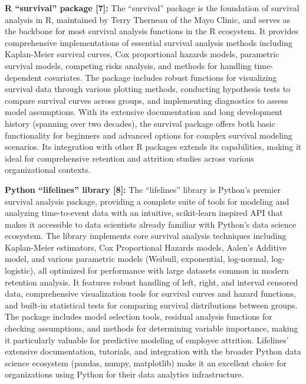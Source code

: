 \documentclass[./main.tex]{subfiles}
\begin{document}
\textbf{R ``survival'' package {[}7{]}:} The ``survival'' package is the
foundation of survival analysis in R, maintained by Terry Therneau of
the Mayo Clinic, and serves as the backbone for most survival analysis
functions in the R ecosystem. It provides comprehensive implementations
of essential survival analysis methods including Kaplan-Meier survival
curves, Cox proportional hazards models, parametric survival models,
competing risks analysis, and methods for handling time-dependent
covariates. The package includes robust functions for visualizing
survival data through various plotting methods, conducting hypothesis
tests to compare survival curves across groups, and implementing
diagnostics to assess model assumptions. With its extensive
documentation and long development history (spanning over two decades),
the survival package offers both basic functionality for beginners and
advanced options for complex survival modeling scenarios. Its
integration with other R packages extends its capabilities, making it
ideal for comprehensive retention and attrition studies across various
organizational contexts.

\textbf{Python ``lifelines'' library {[}8{]}:} The ``lifelines'' library
is Python's premier survival analysis package, providing a complete
suite of tools for modeling and analyzing time-to-event data with an
intuitive, scikit-learn inspired API that makes it accessible to data
scientists already familiar with Python's data science ecosystem. The
library implements core survival analysis techniques including
Kaplan-Meier estimators, Cox Proportional Hazards models, Aalen's
Additive model, and various parametric models (Weibull, exponential,
log-normal, log-logistic), all optimized for performance with large
datasets common in modern retention analysis. It features robust
handling of left, right, and interval censored data, comprehensive
visualization tools for survival curves and hazard functions, and
built-in statistical tests for comparing survival distributions between
groups. The package includes model selection tools, residual analysis
functions for checking assumptions, and methods for determining variable
importance, making it particularly valuable for predictive modeling of
employee attrition. Lifelines' extensive documentation, tutorials, and
integration with the broader Python data science ecosystem (pandas,
numpy, matplotlib) make it an excellent choice for organizations using
Python for their data analytics infrastructure.
\end{document}
